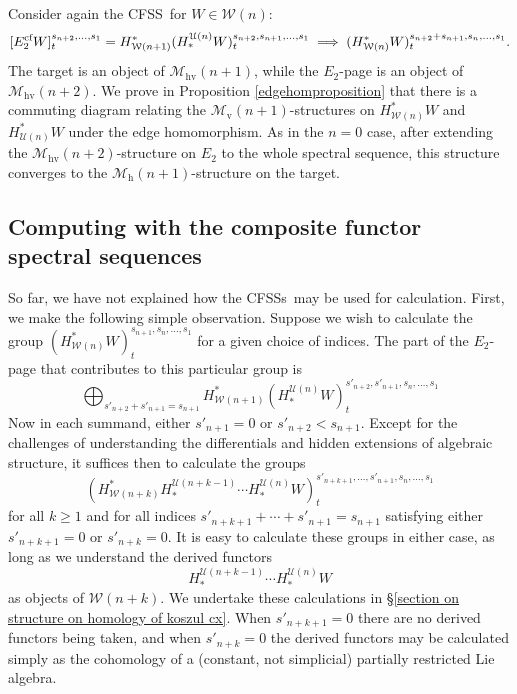 \documentclass[11pt]{amsart} \renewcommand{\baselinestretch}{1.2}
\theoremstyle{plain}
\numberwithin{equation}{section} %
\theoremstyle{plain}
\numberwithin{equation}{chapter} %
\newcommand{\calW}{\mathcal{W}}
\newcommand{\calU}{\mathcal{U}}
\newcommand{\calw}{\mathcal{W}}
\newcommand{\calu}{\mathcal{U}}
\newcommand{\calMv}{\mathcal{M}\dver}
\newcommand{\calMh}{\mathcal{M}\dhor}
\newcommand{\calMhv}{\mathcal{M}_\mathrm{hv}}
\newcommand{\E}[5]{[E^{#1}_{#2}#3]^{#4}_{#5}}
\newcommand{\dver}{_\mathrm{v}}
\newcommand{\dhor}{_\mathrm{h}}
\newcommand{\Sqv}{\mathrm{Sq}\dver}
\newcommand{\CFSS}{CFSS}
\newcommand{\CFSSs}{CFSSs}
\newcommand{\SubsectionOrSection}[1]{\subsection{#1}}
\begin{document}
\begin{Introduction}
Consider again the \CFSS\ for $W\in\calw(n)$:
\[\E{\textup{cf}}{2}{W}{s_{n+2},\ldots,s_1}{t}=H^*_{\calw(n+1)}(H_*^{\calu(n)}W)^{s_{n+2},s_{n+1},\ldots,s_1}_t\implies (H^*_{\calw(n)} W)_t^{s_{n+2}+s_{n+1},s_n,\ldots,s_1}.\]
The target is an object of $\calMhv(n+1)$, while the $E_2$-page is an object of $\calMhv(n+2)$. %
We prove in Proposition \ref{edgehomproposition} that there is a commuting diagram relating the $\calMv(n+1)$-structures on $H^*_{\calw(n)}W$ and $H^*_{\calU(n)}W$ under the edge homomorphism.
As in the $n=0$ case, after extending the $\calMhv(n+2)$-structure on $E_2$ to the whole spectral sequence, this structure converges to the $\calMh(n+1)$-structure on the target.

\SubsectionOrSection{Computing with the composite functor spectral sequences}
So far, we have not explained how the \CFSSs\ may be used for calculation. First, we make the following simple observation. Suppose we wish to calculate the group $(H^*_{\calw(n)} W)_t^{s_{n+1},s_n,\ldots,s_1}$ for a given choice of indices. The part of the $E_2$-page that contributes to this particular group is 
\[\bigoplus_{s'_{n+2}+s'_{n+1}=s_{n+1}}H^*_{\calw(n+1)}(H_*^{\calu(n)}W)^{s'_{n+2},s'_{n+1},s_n,\ldots,s_1}_{t}\]
Now in each summand, either $s'_{n+1}=0$ or $s'_{n+2}<s_{n+1}$. Except for the challenges of understanding the differentials and hidden extensions of algebraic structure, it suffices then to calculate the groups
\[(H^{*}_{\calW(n+k)}H_*^{\calu(n+k-1)}\cdots H_*^{\calu(n)}W)^{s'_{n+k+1},\ldots,s'_{n+1},s_n,\ldots,s_1}_{t}\]
for all $k\geq1$ and for all indices $s'_{n+k+1}+\cdots+s'_{n+1}=s_{n+1}$ satisfying either $s'_{n+k+1}=0$ or $s'_{n+k}=0$. 
It is easy to calculate these groups in either case, as long as we understand the derived functors
\[H_*^{\calu(n+k-1)}\cdots H_*^{\calu(n)}W\]
 as objects of $\calw(n+k)$. We undertake these calculations in \S\ref{section on structure on homology of koszul cx}. When $s'_{n+k+1}=0$ there are no derived functors being taken, and when $s'_{n+k}=0$ the derived functors may be calculated simply as the cohomology of a (constant, not simplicial) partially restricted Lie algebra.


\end{Introduction}
\end{document}
